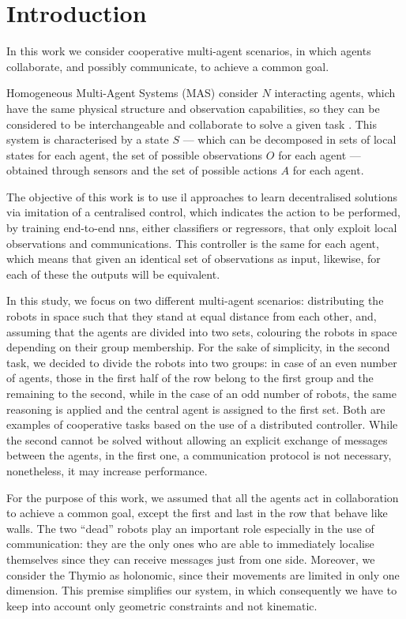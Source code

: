 \chapter{Introduction}
\label{chap:intro}
In this work we consider cooperative multi-agent scenarios, in which agents 
collaborate, and possibly communicate, to achieve a common goal.

Homogeneous Multi-Agent Systems (MAS) consider $N$ interacting agents, which 
have the same physical structure and observation capabilities, so they can be 
considered to be interchangeable and collaborate to solve a given task  
\cite[][]{stone2000multiagent, vsovsic2016inverse}.
This system is characterised by a state $S$ — which can be decomposed in sets of 
local states for each agent, the set of possible observations $O$ for each agent — 
obtained through sensors and the set of possible actions  $A$ for each agent.

The objective of this work is to use \gls{il} approaches to learn decentralised 
solutions via imitation of a centralised control, which indicates the action to be 
performed, by training end-to-end \glspl{nn}, either classifiers or regressors, that 
only exploit local observations and communications. This controller is the same 
for each agent, which means that given an identical set of observations as input, 
likewise, for each of these the outputs will be equivalent.

In this study, we focus on two different multi-agent scenarios: distributing the 
robots in space such that they stand at equal distance from each other, and, 
assuming that the agents are divided into two sets, colouring the robots in space 
depending on their group membership. 
For the sake of simplicity, in the second task, we decided to divide the robots into 
two groups: in case of an even number of agents, those in the first half of the row 
belong to the first group and the remaining to the second, while in the case of an 
odd number of robots, the same reasoning is applied and the central agent is 
assigned to the first set.
Both are examples of cooperative tasks based on the use of a distributed 
controller. While the second cannot be solved without allowing an explicit 
exchange of messages between the agents, in the first one, a communication 
protocol is not necessary, nonetheless, it may increase performance.

For the purpose of this work, we assumed that all the agents act in collaboration 
to achieve a common goal, except the first and last in the row that behave like 
walls. The two ``dead'' robots play an important role especially in the use of 
communication: they are the only ones who are able to immediately localise 
themselves since they can receive messages just from one side.
Moreover, we consider the Thymio as holonomic, since their movements are 
limited in only one dimension. This premise simplifies our system, in which 
consequently we have to keep into account only geometric constraints and not
kinematic.


